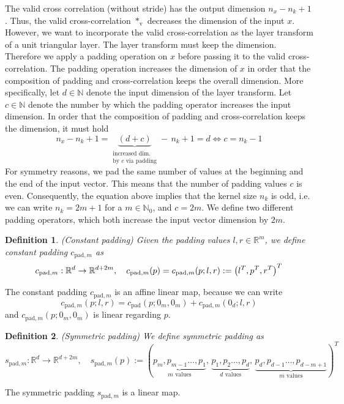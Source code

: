 \documentclass[twoside,a4paper]{article}
\newtheorem{definition}{Definition}
\begin{document}
The valid cross correlation (without stride) has the output dimension $n_x - n_k + 1$.
Thus, the valid cross-correlation $*_{\text{v}}$ decreases the dimension of the input $x$.
However, we want to incorporate the valid cross-correlation as the layer transform of a
unit triangular layer. The layer transform must keep the dimension.
Therefore we apply a padding operation on $x$ before passing it to the valid
cross-correlation. The padding operation increases the dimension of $x$ in order
that the composition of padding and cross-correlation keeps the overall dimension.
More specifically, let $d \in \mathbb{N}$ denote the input dimension of the layer transform.
Let $c \in \mathbb{N}$ denote the number by which the padding operator increases 
the input dimension. In order that the composition of padding and cross-correlation
keeps the dimension, it must hold
\begin{equation*}
	n_x - n_k + 1 = \underbrace{(d+c)}_{\substack{
		\text{increased dim.} \\
		\text{by } c \text{ via padding}
	}} - \, n_k + 1 = d \iff c = n_k-1
\end{equation*}
For symmetry reasons, we pad the same number of values at the beginning and 
the end of the input vector. This means that the number of padding values $c$ is even. 
Consequently, the equation above implies that the kernel size $n_k$ is odd, i.e. we can write
$n_k = 2m+1$ for a $m \in \mathbb{N}_0$, and $c=2m$. We define two different padding operators,
which both increase the input vector dimension by $2m$.

\begin{definition}
	(Constant padding)
	Given the padding values $l,r \in \mathbb{R}^m$, we define constant padding 
	$c_{\text{pad},m}$ as
	\begin{equation*}
		c_{\text{pad},m} : \mathbb{R}^d \to \mathbb{R}^{d+2m},
		\quad c_{\text{pad},m}(p) = c_{\text{pad},m}(p;l,r) := \left( l^T, p^T, r^T \right)^T
	\end{equation*}
\end{definition}
The constant padding $c_{\text{pad},m}$ is an affine linear map, because we can write
\begin{equation}\label{cpad_affine}
	c_{\text{pad},m}(p;l,r) = c_{\text{pad}}(p;0_m,0_m)
	+ c_{\text{pad},m}(0_d;l,r)
\end{equation}
and $c_{\text{pad},m}(p;0_m,0_m)$ is linear regarding $p$.

\begin{definition}
	(Symmetric padding)
	We define symmetric padding as
	\begin{equation*}
		s_{\text{pad},m} : \mathbb{R}^d \to \mathbb{R}^{d+2m},
		\quad s_{\text{pad},m}(p) := (
			\underbrace{p_m, p_{m-1} \dots, p_1}_{m \text{ values}}, \,
			\underbrace{p_1, p_2 \dots, p_d}_{d \text{ values}}, \,
			\underbrace{p_d, p_{d-1} \dots, p_{d-m+1}}_{m \text{ values}}
		)^T
	\end{equation*}
\end{definition}
The symmetric padding $s_{\text{pad},m}$ is a linear map.
\end{document}
